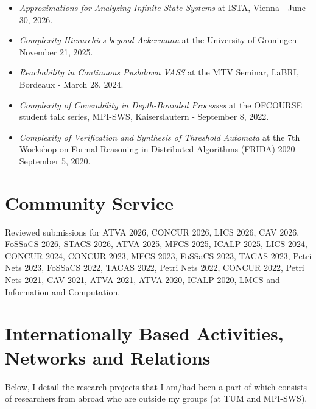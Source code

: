 \documentclass[11pt,a4paper,sans]{moderncv}        %
\begin{document}
\begin{itemize}
	\setlength\itemsep{2pt} 
	\item \textit{Approximations for Analyzing Infinite-State Systems} at ISTA, Vienna - June 30, 2026.
	\item \textit{Complexity Hierarchies beyond Ackermann} at the University of Groningen - November 21, 2025. 
	\item \textit{Reachability in Continuous Pushdown VASS} at the MTV Seminar, LaBRI, Bordeaux - March 28, 2024.
	\item \textit{Complexity of Coverability in Depth-Bounded Processes} at 
	the OFCOURSE student talk series, MPI-SWS, Kaiserslautern - September 8, 2022.
	\item \textit{Complexity of Verification and Synthesis of Threshold Automata} at 
	the 7th Workshop on Formal Reasoning in Distributed Algorithms (FRIDA) 2020 - September 5, 2020. 
\end{itemize}




\section{Community Service}

Reviewed submissions for ATVA 2026, CONCUR 2026, LICS 2026, CAV 2026, FoSSaCS 2026, STACS 2026, ATVA 2025, MFCS 2025, ICALP 2025, LICS 2024, CONCUR 2024, CONCUR 2023, MFCS 2023, FoSSaCS 2023, TACAS 2023, Petri Nets 2023, FoSSaCS 2022, TACAS 2022, Petri Nets 2022, CONCUR 2022, Petri Nets 2021, CAV 2021, ATVA 2021, ATVA 2020, ICALP 2020, LMCS and Information and Computation. 


\section{Internationally Based Activities, Networks and Relations}

Below, I detail the research projects that I am/had been a part of which consists of researchers from abroad who are outside my groups (at TUM and MPI-SWS).

\vspace{5pt}
\end{document}
